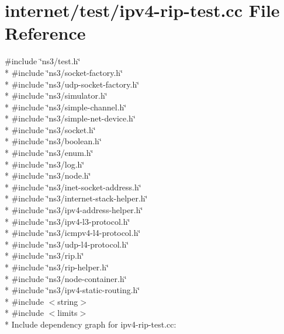 \hypertarget{ipv4-rip-test_8cc}{}\section{internet/test/ipv4-\/rip-\/test.cc File Reference}
\label{ipv4-rip-test_8cc}
{\ttfamily \#include \char`\"{}ns3/test.\+h\char`\"{}}\\*
{\ttfamily \#include \char`\"{}ns3/socket-\/factory.\+h\char`\"{}}\\*
{\ttfamily \#include \char`\"{}ns3/udp-\/socket-\/factory.\+h\char`\"{}}\\*
{\ttfamily \#include \char`\"{}ns3/simulator.\+h\char`\"{}}\\*
{\ttfamily \#include \char`\"{}ns3/simple-\/channel.\+h\char`\"{}}\\*
{\ttfamily \#include \char`\"{}ns3/simple-\/net-\/device.\+h\char`\"{}}\\*
{\ttfamily \#include \char`\"{}ns3/socket.\+h\char`\"{}}\\*
{\ttfamily \#include \char`\"{}ns3/boolean.\+h\char`\"{}}\\*
{\ttfamily \#include \char`\"{}ns3/enum.\+h\char`\"{}}\\*
{\ttfamily \#include \char`\"{}ns3/log.\+h\char`\"{}}\\*
{\ttfamily \#include \char`\"{}ns3/node.\+h\char`\"{}}\\*
{\ttfamily \#include \char`\"{}ns3/inet-\/socket-\/address.\+h\char`\"{}}\\*
{\ttfamily \#include \char`\"{}ns3/internet-\/stack-\/helper.\+h\char`\"{}}\\*
{\ttfamily \#include \char`\"{}ns3/ipv4-\/address-\/helper.\+h\char`\"{}}\\*
{\ttfamily \#include \char`\"{}ns3/ipv4-\/l3-\/protocol.\+h\char`\"{}}\\*
{\ttfamily \#include \char`\"{}ns3/icmpv4-\/l4-\/protocol.\+h\char`\"{}}\\*
{\ttfamily \#include \char`\"{}ns3/udp-\/l4-\/protocol.\+h\char`\"{}}\\*
{\ttfamily \#include \char`\"{}ns3/rip.\+h\char`\"{}}\\*
{\ttfamily \#include \char`\"{}ns3/rip-\/helper.\+h\char`\"{}}\\*
{\ttfamily \#include \char`\"{}ns3/node-\/container.\+h\char`\"{}}\\*
{\ttfamily \#include \char`\"{}ns3/ipv4-\/static-\/routing.\+h\char`\"{}}\\*
{\ttfamily \#include $<$string$>$}\\*
{\ttfamily \#include $<$limits$>$}\\*
Include dependency graph for ipv4-\/rip-\/test.cc\+:
